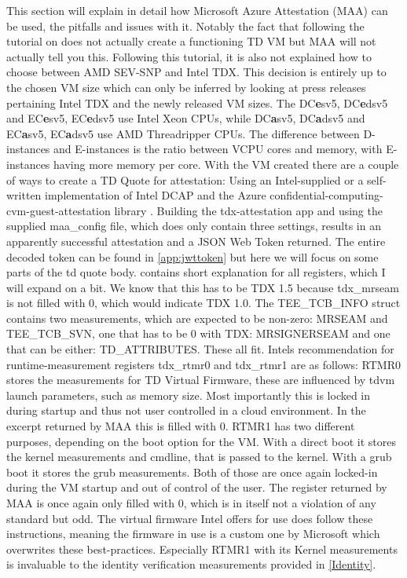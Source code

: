 This section will explain in detail how Microsoft Azure Attestation (MAA) can be used, the pitfalls and issues with it. Notably the fact that following the tutorial on \cite{chasecrum_github_create_2024} does not actually create a functioning TD VM but MAA will not actually tell you this. Following this tutorial, it is also not explained how to choose between AMD SEV-SNP and Intel TDX. This decision is entirely up to the chosen VM size which can only be inferred by looking at press releases pertaining Intel TDX and the newly released VM sizes. The DC\textbf{e}sv5, DC\textbf{e}dsv5 and EC\textbf{e}sv5, EC\textbf{e}dsv5 use Intel Xeon CPUs, while DC\textbf{a}sv5, DC\textbf{a}dsv5 and EC\textbf{a}sv5, EC\textbf{a}dsv5 use AMD Threadripper CPUs. The difference between D-instances and E-instances is the ratio between VCPU cores and memory, with E-instances having more memory per core. With the VM created there are a couple of ways to create a TD Quote for attestation: Using an Intel-supplied or a self-written implementation of Intel DCAP and the Azure confidential-computing-cvm-guest-attestation library \cite{microsoft_corporation_azureconfidential-computing-cvm-guest-attestation_nodate}. Building the tdx-attestation app and using the supplied maa\_config file, which does only contain three settings, results in an apparently successful attestation and a JSON Web Token returned. The entire decoded token can be found in \ref{app:jwttoken} but here we will focus on some parts of the td quote body. \cite{intel_corporation_dcap_2024-1} contains short explanation for all registers, which I will expand on a bit. We know that this has to be TDX 1.5 because tdx\_mrseam is not filled with 0, which would indicate TDX 1.0. The TEE\_TCB\_INFO struct contains two measurements, which are expected to be non-zero: MRSEAM and TEE\_TCB\_SVN, one that has to be 0 with TDX: MRSIGNERSEAM and one that can be either: TD\_ATTRIBUTES. These all fit. Intels recommendation for runtime-measurement registers tdx\_rtmr0 and tdx\_rtmr1 are as follows: RTMR0 stores the measurements for TD Virtual Firmware, these are influenced by tdvm launch parameters, such as memory size. Most importantly this is locked in during startup and thus not user controlled in a cloud environment. In the excerpt returned by MAA this is filled with 0. RTMR1 has two different purposes, depending on the boot option for the VM. With a direct boot it stores the kernel measurements and cmdline, that is passed to the kernel. With a grub boot it stores the grub measurements. Both of those are once again locked-in during the VM startup and out of control of the user. The register returned by MAA is once again only filled with 0, which is in itself not a violation of any standard but odd. The virtual firmware Intel offers for use does follow these instructions, meaning the firmware in use is a custom one by Microsoft which overwrites these best-practices. Especially RTMR1 with its Kernel measurements is invaluable to the identity verification measurements provided in \ref{Identity}. 



